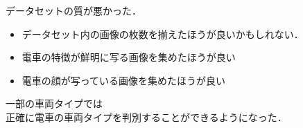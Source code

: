 
 データセットの質が悪かった．

\begin{itemize}	
	\item データセット内の画像の枚数を揃えたほうが良いかもしれない．
	
	\item 電車の特徴が鮮明に写る画像を集めたほうが良い
	
	\item 電車の顔が写っている画像を集めたほうが良い
	
	
\end{itemize}


一部の車両タイプでは\\
正確に電車の車両タイプを判別することができるようになった．

 





